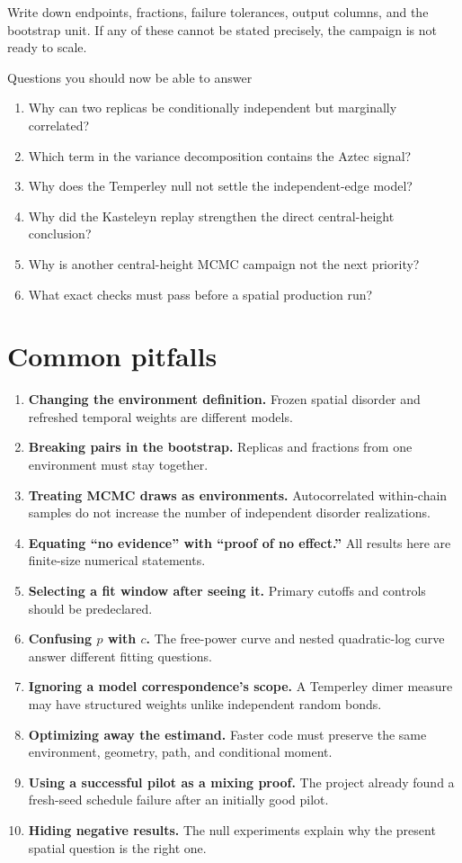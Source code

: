 \documentclass[11pt,a4paper,oneside,openany]{memoir}
\newcommand{\1}{\bm{1}}
\begin{document}
Write down endpoints, fractions, failure tolerances, output columns, and the
bootstrap unit. If any of these cannot be stated precisely, the campaign is
not ready to scale.

\begin{practicebox}{Questions you should now be able to answer}
\begin{enumerate}
  \item Why can two replicas be conditionally independent but marginally correlated?
  \item Which term in the variance decomposition contains the Aztec signal?
  \item Why does the Temperley null not settle the independent-edge model?
  \item Why did the Kasteleyn replay strengthen the direct central-height conclusion?
  \item Why is another central-height MCMC campaign not the next priority?
  \item What exact checks must pass before a spatial production run?
\end{enumerate}
\end{practicebox}

\chapter{Common pitfalls}

\begin{enumerate}
  \item \textbf{Changing the environment definition.} Frozen spatial disorder
  and refreshed temporal weights are different models.
  \item \textbf{Breaking pairs in the bootstrap.} Replicas and fractions from
  one environment must stay together.
  \item \textbf{Treating MCMC draws as environments.} Autocorrelated within-chain
  samples do not increase the number of independent disorder realizations.
  \item \textbf{Equating ``no evidence'' with ``proof of no effect.''} All
  results here are finite-size numerical statements.
  \item \textbf{Selecting a fit window after seeing it.} Primary cutoffs and
  controls should be predeclared.
  \item \textbf{Confusing $p$ with $c$.} The free-power curve and nested
  quadratic-log curve answer different fitting questions.
  \item \textbf{Ignoring a model correspondence's scope.} A Temperley dimer
  measure may have structured weights unlike independent random bonds.
  \item \textbf{Optimizing away the estimand.} Faster code must preserve the
  same environment, geometry, path, and conditional moment.
  \item \textbf{Using a successful pilot as a mixing proof.} The project already
  found a fresh-seed schedule failure after an initially good pilot.
  \item \textbf{Hiding negative results.} The null experiments explain why the
  present spatial question is the right one.
\end{enumerate}
\end{document}
